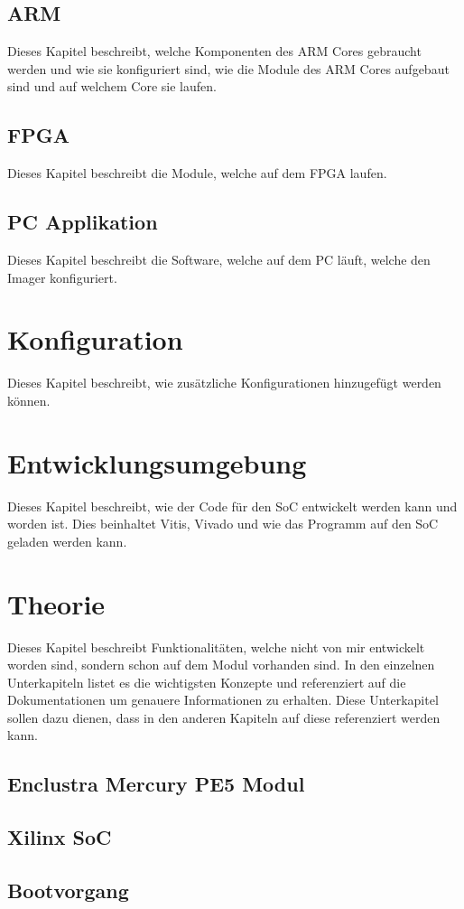 \documentclass{article}
\begin{document}
\subsection{ARM}
Dieses Kapitel beschreibt, welche Komponenten des ARM Cores gebraucht werden und wie sie konfiguriert sind, wie die Module des ARM Cores aufgebaut sind und auf welchem Core sie laufen.
\subsection{FPGA}
Dieses Kapitel beschreibt die Module, welche auf dem FPGA laufen.
\subsection{PC Applikation}
Dieses Kapitel beschreibt die Software, welche auf dem PC läuft, welche den Imager konfiguriert.


\section{Konfiguration}
Dieses Kapitel beschreibt, wie zusätzliche Konfigurationen hinzugefügt werden können.

\section{Entwicklungsumgebung}
Dieses Kapitel beschreibt, wie der Code für den SoC entwickelt werden kann und worden ist. Dies beinhaltet Vitis, Vivado und wie das Programm auf den SoC geladen werden kann.

\section{Theorie}
Dieses Kapitel beschreibt Funktionalitäten, welche nicht von mir entwickelt worden sind, sondern schon auf dem Modul vorhanden sind. In den einzelnen Unterkapiteln listet es die wichtigsten Konzepte und referenziert auf die Dokumentationen um genauere Informationen zu erhalten. Diese Unterkapitel sollen dazu dienen, dass in den anderen Kapiteln auf diese referenziert werden kann.
\subsection{Enclustra Mercury PE5 Modul}
\subsection{Xilinx SoC}
\subsection{Bootvorgang}
\end{document}
